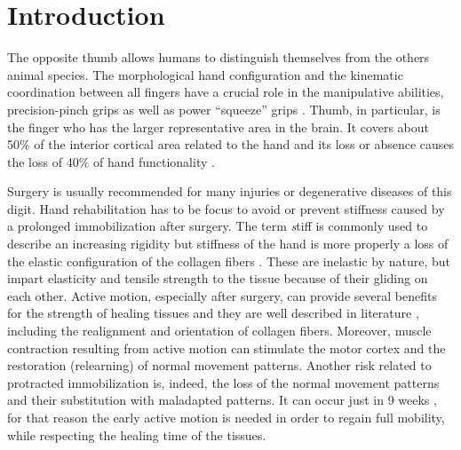 \documentclass{bmcart}
\begin{document}


\section*{Introduction}

The opposite thumb allows humans to distinguish themselves from the others animal species. The morphological hand configuration and the kinematic coordination between all fingers have a crucial role in the manipulative abilities, precision-pinch grips as well as power “squeeze” grips \cite{napier1956prehensile} \cite{marzke1997precision} \cite{marzke1992evolution}. Thumb, in particular, is the finger who has the larger representative area in the brain. It covers about 50\% of the interior cortical area related to the hand and its loss or absence causes the loss of 40\% of hand functionality \cite{flatt2002our}. 

Surgery is usually recommended for many injuries or degenerative diseases of this digit. Hand rehabilitation has to be focus to avoid or prevent stiffness caused by a prolonged immobilization after surgery.
The term \textit stiff is commonly used to describe an increasing rigidity but stiffness of the hand is more properly a loss of the elastic configuration of the collagen fibers \cite{frank1984physiology}. These are inelastic by nature, but impart elasticity and tensile strength to the tissue because of their gliding on each other. Active motion, especially after surgery, can provide several benefits for the strength of healing tissues and they are well described in literature \cite{akeson1987effects} \cite{cyr1998controlled} \cite{gelberman1981influence}, including the realignment and orientation of collagen fibers. Moreover, muscle contraction resulting from active motion can stimulate the motor cortex and the restoration (relearning) of normal movement patterns. Another risk related to protracted immobilization is, indeed, the loss of the normal movement patterns and their substitution with maladapted patterns. It can occur just in 9 weeks \cite{kleim1998functional}, for that reason the early active motion is needed in order to regain full mobility, while respecting the healing time of the tissues. 
 
\end{document}
